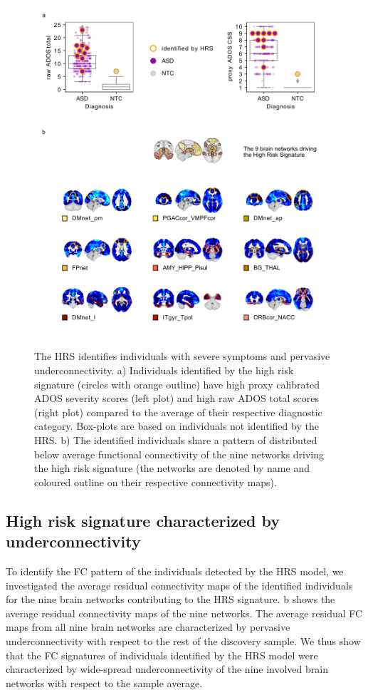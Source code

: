 \documentclass[9pt,lineno]{elife}
\begin{document}
\begin{figure}
\includegraphics[width=\linewidth]{fig3_profile}
    \caption{The HRS identifies individuals with severe symptoms and pervasive underconnectivity.
a) Individuals identified by the high risk signature (circles with orange outline) have high proxy calibrated ADOS severity scores (left plot) and high raw ADOS total scores (right plot) compared to the average of their respective diagnostic category. Box-plots are based on individuals not identified by the HRS. b) The identified individuals share a pattern of distributed below average functional connectivity of the nine networks driving the high risk signature (the networks are denoted by name and coloured outline on their respective connectivity maps).}
\label{fig:3_profile}
\label{figdata:fifth}
\end{figure}

\subsection{High risk signature characterized by underconnectivity}
To identify the FC pattern of the individuals detected by the HRS model, we investigated the average residual connectivity maps of the identified individuals for the nine brain networks contributing to the HRS signature. b shows the average residual connectivity maps of the nine networks. The average residual FC maps from all nine brain networks are characterized by pervasive underconnectivity with respect to the rest of the discovery sample. We thus show that the FC signatures of individuals identified by the HRS model were characterized by wide-spread underconnectivity of the nine involved brain networks with respect to the sample average.
\end{document}
